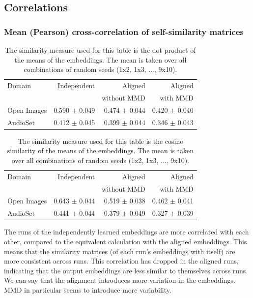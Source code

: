 \subsection{Correlations}
\subsubsection{Mean (Pearson) cross-correlation of self-similarity matrices}
\begin{table}[H]
\centering
\begin{tabular}{lrrr}
\toprule
Domain &   Independent & Aligned     &  Aligned  \\
       &               & without MMD &  with MMD \\
\midrule
Open Images    & 0.590 $\pm$ 0.049 & 0.474 $\pm$ 0.044 &     0.420 $\pm$  0.040 \\
AudioSet    & 0.412 $\pm$ 0.045 &  0.399 $\pm$ 0.044  &      0.346  $\pm$ 0.043  \\
\bottomrule
\end{tabular}
\caption{The similarity measure used for this table is the dot product of the means of the embeddings. The mean is taken over all combinations of random seeds (1x2, 1x3, ..., 9x10).}
\end{table}

\begin{table}[H]
\centering
\begin{tabular}{lrrr}
\toprule
Domain &   Independent & Aligned     &  Aligned  \\
       &               & without MMD &  with MMD \\
\midrule
Open Images    & 0.643 $\pm$ 0.044 & 0.519 $\pm$ 0.038 &     0.462 $\pm$  0.041 \\
AudioSet    & 0.441 $\pm$ 0.044 &  0.379 $\pm$ 0.049  &      0.327  $\pm$ 0.039  \\
\bottomrule
\end{tabular}
\caption{The similarity measure used for this table is the cosine similarity of the means of the embeddings. The mean is taken over all combinations of random seeds (1x2, 1x3, ..., 9x10).}
\end{table}

The runs of the independently learned embeddings are more correlated with each other, compared to the equivalent calculation with the aligned embeddings. This means that the similarity matrices (of each run's embeddings with itself) are more consistent across runs. This correlation has dropped in the aligned runs, indicating that the output embeddings are less similar to themselves across runs. We can say that the alignment introduces more variation in the embeddings. MMD in particular seems to introduce more variability. 

